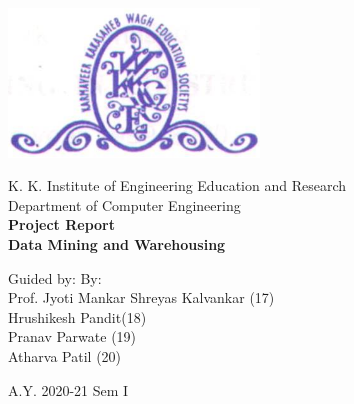 \begin{titlepage}
    \begin{center}
        \begin{center}
             \includegraphics[width=0.5\textwidth]{figures/collegelogo.png}
        \end{center}
        \Large
        K. K. Institute of Engineering Education and Research\\
        Department of Computer Engineering\\
        \vspace{0.5 in}
        \Huge
        \textbf{Project Report}\\
        \vspace*{0.5 in}
        \Large
        \textbf{Data Mining and Warehousing}
        \vspace{1 in}
                
        \Large
        Guided by:                  \hfill                 By: \hspace*{1.35in} \\
        Prof. Jyoti Mankar     \hfill           Shreyas Kalvankar (17)\\
        				\hspace{2.95 in}			 Hrushikesh Pandit(18)\\
        				\hspace{2.8 in}			 Pranav Parwate (19)\\
        				\hspace{2.55 in}			 Atharva Patil (20)\\
        
        \vspace*{1 in}
        
        A.Y. 2020-21 Sem I
    \end{center}
\end{titlepage}
